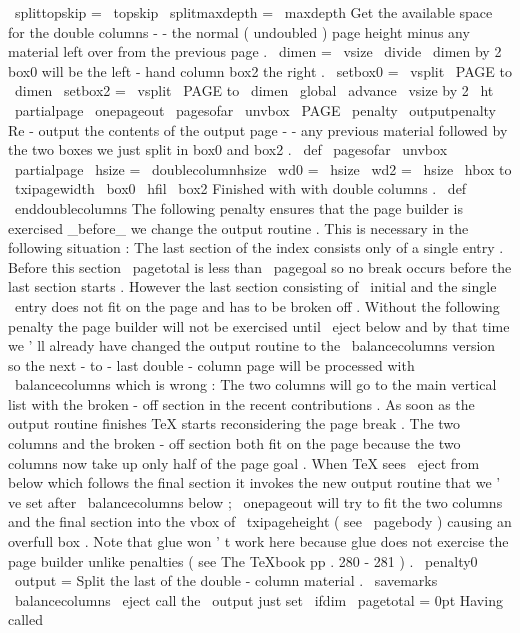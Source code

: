 {{{{
%
%
\
splittopskip
=
\
topskip
\
splitmaxdepth
=
\
maxdepth
%
Get
the
available
space
for
the
double
columns
-
-
the
normal
%
(
undoubled
)
page
height
minus
any
material
left
over
from
the
%
previous
page
.
\
dimen
=
\
vsize
\
divide
\
dimen
by
2
%
%
box0
will
be
the
left
-
hand
column
box2
the
right
.
\
setbox0
=
\
vsplit
\
PAGE
to
\
dimen
\
setbox2
=
\
vsplit
\
PAGE
to
\
dimen
\
global
\
advance
\
vsize
by
2
\
ht
\
partialpage
\
onepageout
\
pagesofar
\
unvbox
\
PAGE
\
penalty
\
outputpenalty
}
%
%
Re
-
output
the
contents
of
the
output
page
-
-
any
previous
material
%
followed
by
the
two
boxes
we
just
split
in
box0
and
box2
.
\
def
\
pagesofar
{
%
\
unvbox
\
partialpage
%
\
hsize
=
\
doublecolumnhsize
\
wd0
=
\
hsize
\
wd2
=
\
hsize
\
hbox
to
\
txipagewidth
{
\
box0
\
hfil
\
box2
}
%
}
%
Finished
with
with
double
columns
.
\
def
\
enddoublecolumns
{
%
%
The
following
penalty
ensures
that
the
page
builder
is
exercised
%
_before_
we
change
the
output
routine
.
This
is
necessary
in
the
%
following
situation
:
%
%
The
last
section
of
the
index
consists
only
of
a
single
entry
.
%
Before
this
section
\
pagetotal
is
less
than
\
pagegoal
so
no
%
break
occurs
before
the
last
section
starts
.
However
the
last
%
section
consisting
of
\
initial
and
the
single
\
entry
does
not
%
fit
on
the
page
and
has
to
be
broken
off
.
Without
the
following
%
penalty
the
page
builder
will
not
be
exercised
until
\
eject
%
below
and
by
that
time
we
'
ll
already
have
changed
the
output
%
routine
to
the
\
balancecolumns
version
so
the
next
-
to
-
last
%
double
-
column
page
will
be
processed
with
\
balancecolumns
which
%
is
wrong
:
The
two
columns
will
go
to
the
main
vertical
list
with
%
the
broken
-
off
section
in
the
recent
contributions
.
As
soon
as
%
the
output
routine
finishes
TeX
starts
reconsidering
the
page
%
break
.
The
two
columns
and
the
broken
-
off
section
both
fit
on
the
%
page
because
the
two
columns
now
take
up
only
half
of
the
page
%
goal
.
When
TeX
sees
\
eject
from
below
which
follows
the
final
%
section
it
invokes
the
new
output
routine
that
we
'
ve
set
after
%
\
balancecolumns
below
;
\
onepageout
will
try
to
fit
the
two
columns
%
and
the
final
section
into
the
vbox
of
\
txipageheight
(
see
%
\
pagebody
)
causing
an
overfull
box
.
%
%
Note
that
glue
won
'
t
work
here
because
glue
does
not
exercise
the
%
page
builder
unlike
penalties
(
see
The
TeXbook
pp
.
280
-
281
)
.
\
penalty0
%
\
output
=
{
%
%
Split
the
last
of
the
double
-
column
material
.
\
savemarks
\
balancecolumns
}
%
\
eject
%
call
the
\
output
just
set
\
ifdim
\
pagetotal
=
0pt
%
Having
called
\
}}}}
